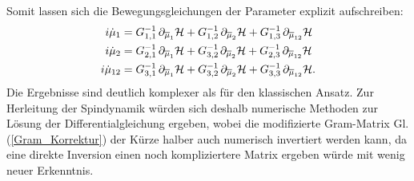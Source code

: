 Somit lassen sich die Bewegungsgleichungen der Parameter explizit aufschreiben:
\begin{align}
    i\dot{\mu}_1 &= G_{1,1}^{-1}\thinspace \partial_{\overline{\mu}_1}\mathcal{H} + G_{1,2}^{-1}\thinspace\partial_{\overline{\mu}_2}\mathcal{H} + G_{1,3}^{-1}\thinspace\partial_{\overline{\mu}_{12}}\mathcal{H}\label{QK_DGL1} \\
    i\dot{\mu}_2 &= G_{2,1}^{-1}\thinspace\partial_{\overline{\mu}_1}\mathcal{H} + G_{3,2}^{-1\thinspace}\partial_{\overline{\mu}_2}\mathcal{H} + G_{2,3}^{-1}\thinspace\partial_{\overline{\mu}_{12}}\mathcal{H} \\
    i\dot{\mu}_{12} &= G_{3,1}^{-1}\thinspace\partial_{\overline{\mu}_1}\mathcal{H} + G_{3,2}^{-1}\thinspace\partial_{\overline{\mu}_2}\mathcal{H} + G_{3,3}^{-1}\thinspace\partial_{\overline{\mu}_{12}}\mathcal{H} \label{QK_DGL3}.
\end{align}
Die Ergebnisse sind deutlich komplexer als für den klassischen Ansatz. Zur Herleitung der Spindynamik würden sich deshalb numerische Methoden zur Lösung der 
Differentialgleichung ergeben, wobei die modifizierte Gram-Matrix Gl. (\ref{Gram_Korrektur}) der Kürze halber auch numerisch invertiert werden kann, da eine 
direkte Inversion einen noch kompliziertere Matrix ergeben würde mit wenig neuer Erkenntnis.
